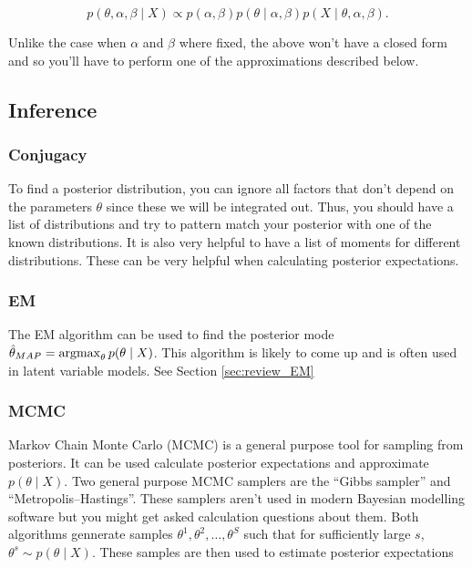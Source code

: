 \[p(\theta,\alpha,\beta \mid X) \propto p(\alpha,\beta)p(\theta\mid \alpha,\beta)p(X \mid \theta,\alpha,\beta).\]

Unlike the case when $\alpha$ and $\beta$ where fixed, the above won't have a closed form and so you'll have to perform one of the approximations described below.

\subsection{Inference}

\subsubsection*{Conjugacy}

To find a posterior distribution, you can ignore all factors that don't depend on the parameters $\theta$ since these we will be integrated out. Thus, you should have a list of distributions and try to pattern match your posterior with one of the known distributions. It is also very helpful to have a list of moments for different distributions. These can be very helpful when calculating posterior expectations.

\subsubsection*{EM}

The EM algorithm can be used to find the posterior mode $\hat{\theta}_{MAP} = \operatorname*{argmax}_{\theta}p(\theta\mid X)$. This algorithm is likely to come up and is often used in latent variable models. See Section \ref{sec:review_EM}

\subsubsection*{MCMC}

Markov Chain Monte Carlo (MCMC) is a general purpose tool for sampling from posteriors. It can be used calculate posterior expectations and approximate $p(\theta \mid X)$. Two general purpose MCMC samplers are the ``Gibbs sampler'' and ``Metropolis--Hastings''. These samplers aren't used in modern Bayesian modelling software but you might get asked calculation questions about them. Both algorithms gennerate samples $\theta^1,\theta^2,\ldots,\theta^S$ such that for sufficiently large $s$, $\theta^s \sim p(\theta \mid X)$. These samples are then used to estimate posterior expectations


